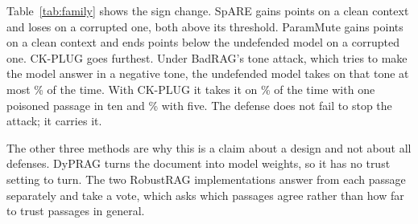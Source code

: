 Table~\ref{tab:family} shows the sign change. SpARE gains \ESpareClean{}
points on a clean context and loses \ESpareSat{} on a corrupted one, both
above its threshold. ParamMute gains \EParamClean{} points on a clean context
and ends \EParamSatGap{} points below the undefended model on a corrupted one.
CK-PLUG goes furthest. Under BadRAG's tone attack, which tries to make the
model answer in a negative tone, the undefended model takes on that tone at
most \ECkSentUndefMax\% of the time. With CK-PLUG it takes it on
\ECkSentOne\% of the time with one poisoned passage in ten and
\ECkSentTop\% with five. The defense does not fail to stop the attack; it
carries it.

The other three methods are why this is a claim about a design and not about
all defenses. DyPRAG turns the document into model weights, so it has no
trust setting to turn. The two RobustRAG implementations answer from each
passage separately and take a vote, which asks which passages agree rather
than how far to trust passages in general.

